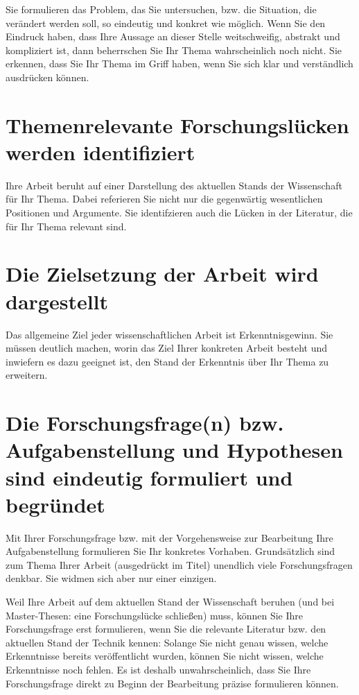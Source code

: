 Sie formulieren das Problem, das Sie untersuchen, bzw. die Situation, die verändert werden soll, so eindeutig und konkret wie möglich. Wenn Sie den Eindruck haben, dass Ihre Aussage an dieser Stelle weitschweifig, abstrakt und kompliziert ist, dann beherrschen Sie Ihr Thema wahrscheinlich noch nicht. Sie erkennen, dass Sie Ihr Thema im Griff haben, wenn Sie sich klar und verständlich ausdrücken können.

\section{Themenrelevante Forschungslücken werden identifiziert}
\label{sec:forschungsluecken}

Ihre Arbeit beruht auf einer Darstellung des aktuellen Stands der Wissenschaft für Ihr Thema. Dabei referieren Sie nicht nur die gegenwärtig wesentlichen Positionen und Argumente. Sie identifzieren auch die Lücken in der Literatur, die für Ihr Thema relevant sind.

\section{Die Zielsetzung der Arbeit wird dargestellt}
\label{sec:zielsetzung}

Das allgemeine Ziel jeder wissenschaftlichen Arbeit ist Erkenntnisgewinn. Sie müssen deutlich machen, worin das Ziel Ihrer konkreten Arbeit besteht und inwiefern es dazu geeignet ist, den Stand der Erkenntnis über Ihr Thema zu erweitern.

\section{Die Forschungsfrage(n) bzw. Aufgabenstellung und Hypothesen sind eindeutig formuliert und begründet}
\label{sec:forschungsfrage-hypothesen}

Mit Ihrer Forschungsfrage bzw. mit der Vorgehensweise zur Bearbeitung Ihre Aufgabenstellung formulieren Sie Ihr konkretes Vorhaben. Grundsätzlich sind zum Thema Ihrer Arbeit (ausgedrückt im Titel) unendlich viele Forschungsfragen denkbar. Sie widmen sich aber nur einer einzigen.

Weil Ihre Arbeit auf dem aktuellen Stand der Wissenschaft beruhen (und bei Master-Thesen: eine Forschungslücke schließen) muss, können Sie Ihre Forschungsfrage erst formulieren, wenn Sie die relevante Literatur bzw. den aktuellen Stand der Technik kennen: Solange Sie nicht genau wissen, welche Erkenntnisse bereits veröffentlicht wurden, können Sie nicht wissen, welche Erkenntnisse noch fehlen. Es ist deshalb unwahrscheinlich, dass Sie Ihre Forschungsfrage direkt zu Beginn der Bearbeitung präzise formulieren können.

